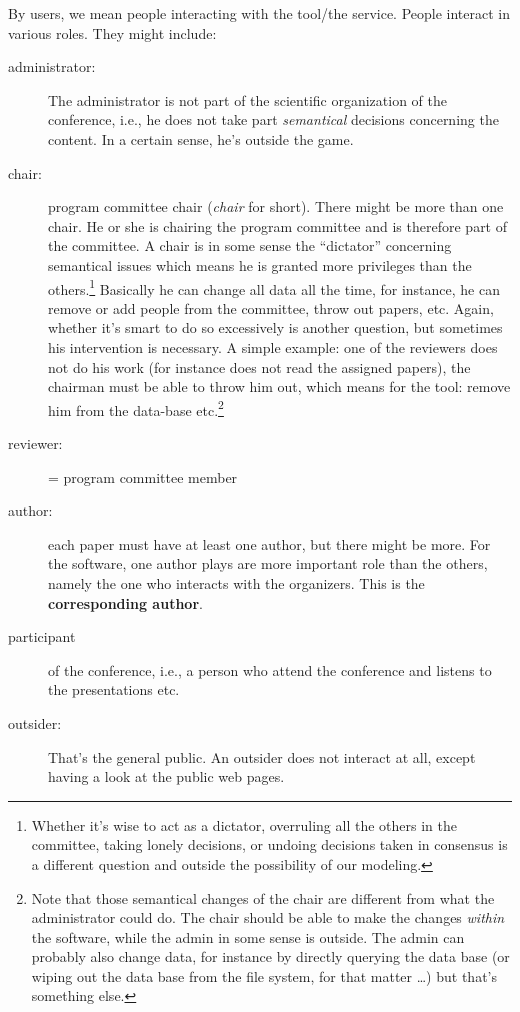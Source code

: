 By users, we mean people interacting with the tool/the service. People
interact in various roles. They might include:
\begin{description}
\item[administrator:] The administrator is not part of the scientific
  organization of the conference, i.e., he does not take part
  \emph{semantical} decisions concerning the content. In a certain sense,
  he's outside the game.
\item[chair:] program committee chair (\emph{chair} for short). There might
  be more than one chair. He or she is chairing the program committee and
  is therefore part of the committee. A chair is in some sense the
  ``dictator'' concerning semantical issues which means he is granted more
  privileges than the others.\footnote{Whether it's wise to act as a
    dictator, overruling all the others in the committee, taking lonely
    decisions, or undoing decisions taken in consensus is a different
    question and outside the possibility of our modeling.} Basically he
  can change all data all the time, for instance, he can remove or add
  people from the committee, throw out papers, etc. Again, whether it's
  smart to do so excessively is another question, but sometimes his
  intervention is necessary. A simple example: one of the reviewers does
  not do his work (for instance does not read the assigned papers), the
  chairman must be able to throw him out, which means for the tool: remove
  him from the data-base etc.\footnote{Note that those semantical changes
    of the chair are different from what the administrator could do. The
    chair should be able to make the changes \emph{within} the software,
    while the admin in some sense is outside. The admin can probably also
    change data, for instance by directly querying the data base (or wiping
    out the data base from the file system, for that matter \ldots) but
    that's something else.}
\item[reviewer:] = program committee member
\item[author:] each paper must have at least one author, but there might be
  more. For the software, one author plays are more important role than the
  others, namely the one who interacts with the organizers. This is the
  \textbf{corresponding author}.
\item[participant] of the conference, i.e., a person who attend the
  conference and listens to the presentations etc.
\item [outsider:] That's the general public. An outsider does not interact
  at all, except having a look at the public web pages.
\end{description}






